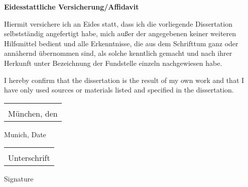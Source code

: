 \thispagestyle{plain}

\large\textbf{Eidesstattliche Versicherung/Affidavit}\\ \vspace{20pt}

\normalsize
Hiermit versichere ich an Eides statt, dass ich die vorliegende Dissertation \textbf{\myTitle} selbstständig angefertigt habe, mich außer der angegebenen keiner weiteren Hilfsmittel bedient und alle Erkenntnisse, die aus dem Schrifttum ganz oder annähernd übernommen sind, als solche kenntlich gemacht und nach ihrer Herkunft unter Bezeichnung der Fundstelle einzeln nachgewiesen habe.\\ 

\vspace{10pt}

I hereby confirm that the dissertation \textbf{\myTitle} is the result of my own work and that I have only used sources or materials listed and specified in the dissertation.

\vspace{60pt}

\newcommand{\sign}[1]{%
  \begin{tabular}[t]{@{}l@{}}
  \makebox[1.5in]{\dotfill}\\
  \strut#1\strut
  \end{tabular}%
}
  \begin{minipage}[t]{0.5\linewidth}
    \sign{München, den}
    \par 
    Munich, Date
  \end{minipage}
  \begin{minipage}[t]{0.5\linewidth}
    \raggedright
    \sign{Unterschrift}
    \par
    Signature
  \end{minipage}%

\newpage
